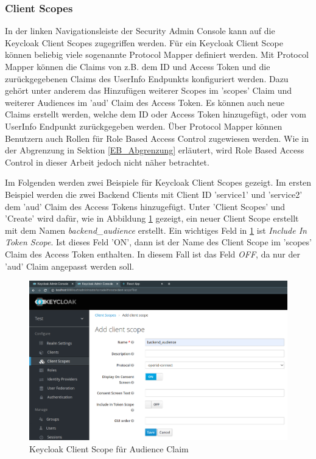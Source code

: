 \subsubsection{Client Scopes}

In der linken Navigationsleiste der Security Admin Console kann auf die Keycloak Client Scopes zugegriffen werden. Für ein Keycloak Client Scope können beliebig viele sogenannte Protocol Mapper definiert werden. Mit Protocol Mapper können die Claims von z.B. dem ID und Access Token und die zurückgegebenen Claims des UserInfo Endpunkts konfiguriert werden. Dazu gehört unter anderem das Hinzufügen weiterer Scopes im 'scopes' Claim und weiterer Audiences im 'aud' Claim des Access Token. Es können auch neue Claims erstellt werden, welche dem ID oder Access Token hinzugefügt, oder vom UserInfo Endpunkt zurückgegeben werden. Über Protocol Mapper können Benutzern auch Rollen für Role Based Access Control zugewiesen werden. Wie in der Abgrenzung in Sektion \ref{EB_Abgrenzung} erläutert, wird Role Based Access Control in dieser Arbeit jedoch nicht näher betrachtet. 

Im Folgenden werden zwei Beispiele für Keycloak Client Scopes gezeigt. Im ersten Beispiel werden die zwei Backend Clients mit Client ID 'service1' und 'service2' dem 'aud' Claim des Access Tokens hinzugefügt. Unter 'Client Scopes' und 'Create' wird dafür, wie in Abbildung \ref{fig:EB_Keycloak Client Scope für Audience Claim} gezeigt, ein neuer Client Scope erstellt mit dem Namen \textit{backend\_audience} erstellt. Ein wichtiges Feld in \ref{fig:EB_Keycloak Client Scope für Audience Claim} ist \textit{Include In Token Scope}. Ist dieses Feld 'ON', dann ist der Name des Client Scope im 'scopes' Claim des Access Token enthalten. In diesem Fall ist das Feld \textit{OFF}, da nur der 'aud' Claim angepasst werden soll.

\begin{figure}[!ht]
	\centering
	\includegraphics[width=1\textwidth]{Images/Ebert/KeycloakNewAudClientScope.PNG}
	\caption{Keycloak Client Scope für Audience Claim}
	\label{fig:EB_Keycloak Client Scope für Audience Claim}
\end{figure}

